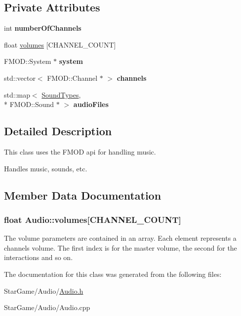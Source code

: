 \subsection*{Private Attributes}
\begin{DoxyCompactItemize}
\item 
\hypertarget{class_audio_a504b2a0591d03d028a3438265a0bd033}{int {\bfseries number\-Of\-Channels}}\label{class_audio_a504b2a0591d03d028a3438265a0bd033}

\item 
float \hyperlink{class_audio_a363a0b18e35bb5d4e2a7ed292b4de654}{volumes} \mbox{[}C\-H\-A\-N\-N\-E\-L\-\_\-\-C\-O\-U\-N\-T\mbox{]}
\item 
\hypertarget{class_audio_ae30095f34e5848ea75805f45711c027e}{F\-M\-O\-D\-::\-System $\ast$ {\bfseries system}}\label{class_audio_ae30095f34e5848ea75805f45711c027e}

\item 
\hypertarget{class_audio_a437fcac7594736294bbca02e55bee50e}{std\-::vector$<$ F\-M\-O\-D\-::\-Channel $\ast$ $>$ {\bfseries channels}}\label{class_audio_a437fcac7594736294bbca02e55bee50e}

\item 
\hypertarget{class_audio_aa482ea07b8459c78123862bd24ee86c2}{std\-::map$<$ \hyperlink{_audio_8h_ad6c201b2d4894f8a7b43d7a07bbac991}{Sound\-Types}, \\*
F\-M\-O\-D\-::\-Sound $\ast$ $>$ {\bfseries audio\-Files}}\label{class_audio_aa482ea07b8459c78123862bd24ee86c2}

\end{DoxyCompactItemize}


\subsection{Detailed Description}
This class uses the F\-M\-O\-D api for handling music. 

Handles music, sounds, etc. 

\subsection{Member Data Documentation}
\hypertarget{class_audio_a363a0b18e35bb5d4e2a7ed292b4de654}{
\subsubsection[{volumes}]{\setlength{\rightskip}{0pt plus 5cm}float Audio\-::volumes\mbox{[}C\-H\-A\-N\-N\-E\-L\-\_\-\-C\-O\-U\-N\-T\mbox{]}\hspace{0.3cm}{\ttfamily [private]}}}\label{class_audio_a363a0b18e35bb5d4e2a7ed292b4de654}
The volume parameters are contained in an array. Each element represents a channels volume. The first index is for the master volume, the second for the interactions and so on. 

The documentation for this class was generated from the following files\-:\begin{DoxyCompactItemize}
\item 
Star\-Game/\-Audio/\hyperlink{_audio_8h}{Audio.\-h}\item 
Star\-Game/\-Audio/Audio.\-cpp\end{DoxyCompactItemize}
